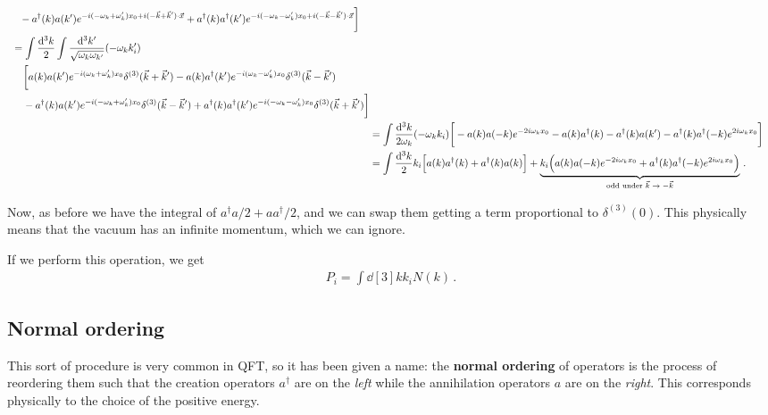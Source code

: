 \documentclass[main.tex]{subfiles}
\begin{document}
\begin{subequations}
\begin{align}
\begin{split}
&\phantom{=}\ -a ^\dag(k) a(k') e^{-i (-\omega_{k} + \omega_{k}') x_0 + i (-\vec{k} + \vec{k}')\cdot \vec{x}} 
+ a ^\dag(k) a ^\dag(k') e^{-i(-\omega_{k} - \omega_{k}') x_0 + i (-\vec{k} - \vec{k}')\cdot \vec{x}} 
\bigg]
\end{split}  \\
\begin{split}
&= \int \frac{ \dd[3]{k}}{2} 
\int \frac{ \dd[3]{k'}}{\sqrt{\omega_{k} \omega_{k'}}} (- \omega_{k} k_i')  \\
&\phantom{=}\ 
\bigg[
a(k) a(k') e^{-i (\omega_{k} + \omega_{k}') x_0} \delta^{(3)} (\vec{k} + \vec{k}') 
-a(k) a ^\dag(k') e^{-i(\omega_{k} - \omega_{k}') x_0} \delta^{(3)}(\vec{k} - \vec{k}') \\
&\phantom{=}\ -a ^\dag(k) a(k') e^{-i (-\omega_{k} + \omega_{k}') x_0}
\delta^{(3)} (\vec{k} - \vec{k}') 
+ a ^\dag(k) a ^\dag(k') e^{-i(-\omega_{k} - \omega_{k}') x_0} \delta^{(3)} (\vec{k} + \vec{k}') 
\bigg]
\end{split}\\
&= \int \frac{ \dd[3]{k}}{2 \omega_{k}} (- \omega_{k} k_i)
\bigg[
- a(k) a(-k) e^{- 2i\omega_{k} x_0}
- a(k) a ^\dag(k) 
- a ^\dag(k) a(k') 
- a ^\dag(k) a ^\dag(-k) e^{2i\omega_{k} x_0} 
\bigg]  \\
&= \int \frac{ \dd[3]{k}}{2} k_i \qty[a(k) a ^\dag (k) + a ^\dag(k) a(k)]
+ \underbrace{k_i \qty( a(k) a(-k) e^{- 2i\omega_{k} x_0} + a ^\dag(k) a ^\dag(-k) e^{2i\omega_{k} x_0} )}_{\text{odd under \(\vec{k} \to - \vec{k}\)}}
\,.
\end{align}
\end{subequations}

Now, as before we have the integral of \(a ^\dag a /2 + a a ^\dag /2\), and we can swap them getting a term proportional to \(\delta^{(3)} (0)\). This physically means that the vacuum has an infinite momentum, which we can ignore. 


If we perform this operation, we get 
%
\begin{align}
P_{i} = \int \dd[3]{k} k_i N(k)
\,.
\end{align}

\subsection{Normal ordering}

This sort of procedure is very common in QFT, so it has been given a name: the \textbf{normal ordering} of operators is the process of reordering them such that the creation operators \(a ^\dag\) are on the \emph{left} while the annihilation operators \(a\) are on the \emph{right}. This corresponds physically to the choice of the positive energy.
\end{document}
